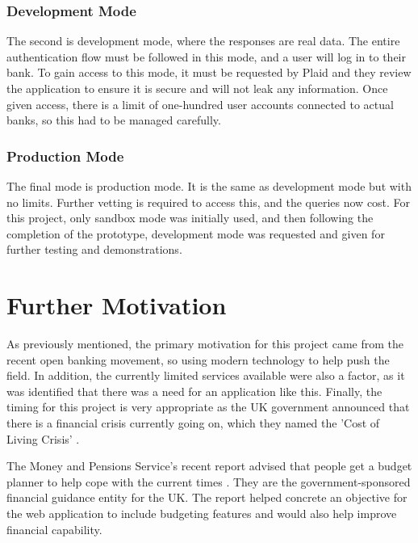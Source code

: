 \subsubsection{Development Mode}
The second is development mode, where the responses are real data. The entire authentication flow must be followed in this mode, and a user will log in to their bank. To gain access to this mode, it must be requested by Plaid and they review the application to ensure it is secure and will not leak any information. Once given access, there is a limit of one-hundred user accounts connected to actual banks, so this had to be managed carefully.

\subsubsection{Production Mode}
The final mode is production mode. It is the same as development mode but with no limits. Further vetting is required to access this, and the queries now cost. For this project, only sandbox mode was initially used, and then following the completion of the prototype, development mode was requested and given for further testing and demonstrations.

\section{Further Motivation}
\label{sec:further-motivation}
As previously mentioned, the primary motivation for this project came from the recent open banking movement, so using modern technology to help push the field. In addition, the currently limited services available were also a factor, as it was identified that there was a need for an application like this. Finally, the timing for this project is very appropriate as the UK government announced that there is a financial crisis currently going on, which they named the 'Cost of Living Crisis' \cite{CostOfLivingCrisisGov}.

The Money and Pensions Service's recent report advised that people get a budget planner to help cope with the current times \cite{MaPS}. They are the government-sponsored financial guidance entity for the UK. The report helped concrete an objective for the web application to include budgeting features and would also help improve financial capability.